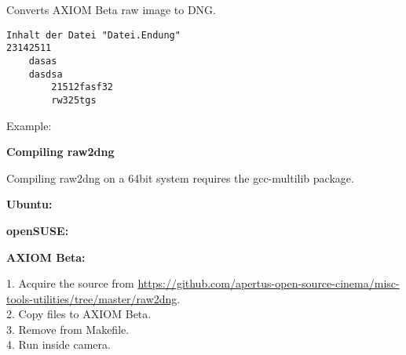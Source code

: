 Converts AXIOM Beta raw image to DNG. 

\begin{verbatim}
Inhalt der Datei "Datei.Endung"
23142511
	dasas
	dasdsa
		21512fasf32
		rw325tgs
\end{verbatim}
          
Example:                       


\textbf{Compiling raw2dng}

Compiling raw2dng on a 64bit system requires the gcc-multilib package.

\textbf{Ubuntu:} 

    
    
\textbf{openSUSE:}

    
    
\textbf{AXIOM Beta:}

1. Acquire the source from \href{https://github.com/apertus-open-source-cinema/misc-tools-utilities/tree/master/raw2dng}{https://github.com/apertus-open-source-cinema/misc-tools-utilities/tree/master/raw2dng}.\\
2. Copy files to AXIOM Beta.\\
3. Remove  from Makefile.\\
4. Run  inside camera.\\                     
                      

